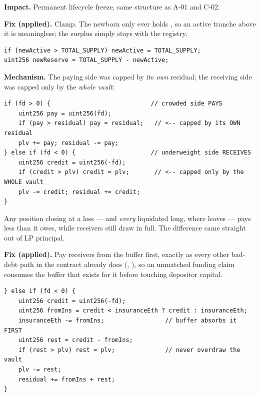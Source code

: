 \textbf{Impact.} Permanent lifecycle freeze, same structure as A-01 and C-02.

\textbf{Fix (applied).} Clamp. The newborn only ever holds ,
so an active tranche above it is meaningless; the surplus simply stays with the
registry.

\begin{lstlisting}[numbers=none]
if (newActive > TOTAL_SUPPLY) newActive = TOTAL_SUPPLY;
uint256 newReserve = TOTAL_SUPPLY - newActive;
\end{lstlisting}



\textbf{Mechanism.} The paying side was capped by its \emph{own} residual; the
receiving side was capped only by the \emph{whole vault}:

\begin{lstlisting}[firstnumber=795]
if (fd > 0) {                            // crowded side PAYS
    uint256 pay = uint256(fd);
    if (pay > residual) pay = residual;   // <-- capped by its OWN residual
    plv += pay; residual -= pay;
} else if (fd < 0) {                     // underweight side RECEIVES
    uint256 credit = uint256(-fd);
    if (credit > plv) credit = plv;       // <-- capped only by the WHOLE vault
    plv -= credit; residual += credit;
}
\end{lstlisting}

Any position closing at a loss --- and \emph{every} liquidated long, where
 leaves  --- pays less than it owes,
while receivers still draw in full. The difference came straight out of LP
principal.

\textbf{Fix (applied).} Pay receivers from the  buffer first,
exactly as every other bad-debt path in the contract already does
(, ), so an unmatched funding claim
consumes the buffer that exists for it before touching depositor capital.

\begin{lstlisting}[numbers=none]
} else if (fd < 0) {
    uint256 credit = uint256(-fd);
    uint256 fromIns = credit < insuranceEth ? credit : insuranceEth;
    insuranceEth -= fromIns;                 // buffer absorbs it FIRST
    uint256 rest = credit - fromIns;
    if (rest > plv) rest = plv;              // never overdraw the vault
    plv -= rest;
    residual += fromIns + rest;
}
\end{lstlisting}

